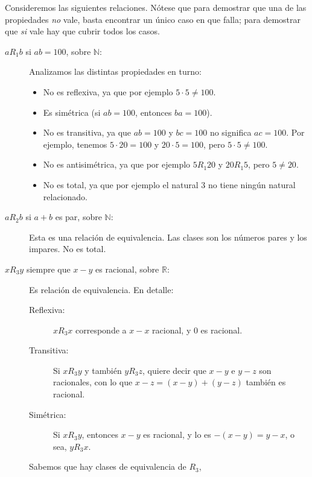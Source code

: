   \begin{example}
    Consideremos las siguientes relaciones.
    Nótese que para demostrar que una de las propiedades \emph{no} vale,
    basta encontrar un único caso en que falla;
    para demostrar que \emph{si} vale hay que cubrir todos los casos.
    \begin{description}
    \item[\boldmath \(a \mathrel{R_1} b\) si \(a b = 100\),
	  sobre \(\mathbb{N}\):\unboldmath]
      Analizamos las distintas propiedades en turno:
      \begin{itemize}
      \item
	No es reflexiva,
	ya que por ejemplo \(5\cdot 5 \ne 100\).
      \item
	Es simétrica
	(si \(a b = 100\), entonces \(b a = 100\)).
      \item
	No es transitiva,
	ya que \(a b = 100\) y \(b c = 100\) no significa \(a c = 100\).
	Por ejemplo, tenemos \(5 \cdot 20 = 100\) y \(20 \cdot 5 = 100\),
	pero \(5 \cdot 5 \ne 100\).
      \item
	No es antisimétrica,
	ya que por ejemplo \(5 \mathrel{R_1} 20\)
	y \(20 \mathrel{R_1} 5\),
	pero \(5 \ne 20\).
      \item
	No es total,
	ya que por ejemplo el natural \(3\)
	no tiene ningún natural relacionado.
      \end{itemize}
    \item[\boldmath \(a \mathrel{R_2} b\) si \(a + b\) es par,
	  sobre \(\mathbb{N}\):\unboldmath]
      Esta es una relación de equivalencia.
      Las clases son los números pares y los impares.
      No es total.
    \item[\boldmath \(x \mathrel{R_3} y\) siempre que \(x - y\) es racional,
	  sobre \(\mathbb{R}\):\unboldmath]
      Es relación de equivalencia.
      En detalle:
      \begin{description}
      \item[Reflexiva:]
	\(x \mathrel{R_3} x\) corresponde a \(x - x\) racional,
	y \(0\) es racional.
      \item[Transitiva:]
	Si \(x \mathrel{R_3} y\) y también \(y \mathrel{R_3} z\),
	quiere decir que \(x -y\) e \(y - z\) son racionales,
	con lo que \(x - z = (x - y) + (y - z)\)
	también es racional.
      \item[Simétrica:]
	Si \(x \mathrel{R_3} y\),
	entonces \(x - y\) es racional,
	y lo es \(-(x - y) = y - x\),
	o sea,
	\(y \mathrel{R_3} x\).
      \end{description}
      Sabemos que hay clases de equivalencia de \(R_3\),

\end{description}
\end{example}
